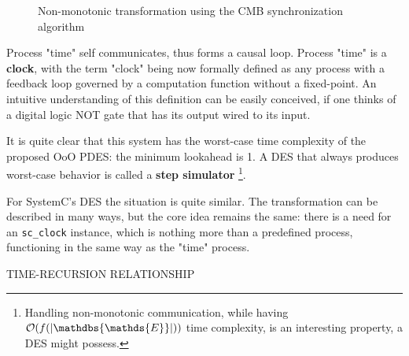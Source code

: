 \documentclass[11pt]{article}
\begin{document}
\begin{figure}[htpb]
\centering
{}
\caption{Non-monotonic transformation using the CMB synchronization algorithm} 
\label{fig:nonmon}
\end{figure}

Process "time" self communicates, thus forms a causal loop.
Process "time" is a \textbf{clock}, with the term "clock" being now formally defined as any process with a feedback loop governed by a computation function without a fixed-point.
An intuitive understanding of this definition can be easily conceived, if one thinks of a digital logic NOT gate that has its output wired to its input.

It is quite clear that this system has the worst-case time complexity of the proposed OoO PDES: the minimum lookahead is 1.
A DES that always produces worst-case behavior is called a \textbf{step simulator} \footnote{Handling non-monotonic communication, while having \(\mathcal{O}(f(|\mathdbs{\mathds{E}}|))\) time complexity, is an interesting property, a DES might possess.}.

For SystemC's DES the situation is quite similar.
The transformation can be described in many ways, but the core idea remains the same:
there is a need for an \texttt{sc\_clock} instance, which is nothing more than a predefined process, functioning in the same way as the "time" process.

TIME-RECURSION RELATIONSHIP



\clearpage
\end{document}

